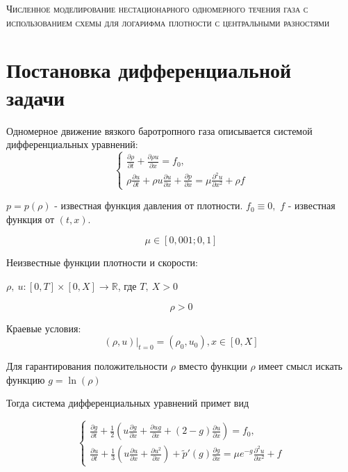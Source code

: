 \documentclass[11pt]{article}
\begin{document}
\begin{center}

\textsc{Численное моделирование нестационарного 
    одномерного течения газа с использованием схемы 
    для логарифма плотности с центральными разностями}

\end{center}

\enlargethispage{9\baselineskip}

\section{Постановка дифференциальной задачи}
Одномерное движение вязкого баротропного газа описывается системой дифференциальных уравнений:
$$
\begin{cases} 
\displaystyle{\frac{\partial \rho}{\partial t} +
 \frac{\partial \rho u}{\partial x} = f_0}, \\

\displaystyle{\rho \frac{\partial u}{\partial t} +
 \rho u \frac{\partial u}{\partial x}+ 
 \frac{\partial p}{\partial x} = 
\mu \frac{\partial^2 u}{\partial x^2}
+ \rho f}
\end{cases}
$$

\begin{center}
$
p = p (\rho)
$ - известная функция давления от плотности. 
$f_0 \equiv 0, $
$f$ - известная функция от $(t, x)$.
\end{center}
$$\mu \in [0,001; 0,1]$$

Неизвестные функции плотности и скорости:

\begin{center}
$\rho,\ u: [0, T] \times [0, X] \rightarrow \mathbb{R}$, где $T,\ X > 0$
\end{center}

$$\rho > 0$$

Краевые условия:
$$(\rho, u)|_{t=0} = (\rho_0, u_0), x \in [0, X]$$

Для гарантирования положительности $\rho$ вместо функции $\rho$ имеет смысл искать функцию $g = \ln(\rho)$ 

Тогда система дифференциальных уравнений примет вид

$$
\begin{cases}
\displaystyle{\frac{\partial g}{\partial t} + \frac{1}{2} \left(u\frac{\partial g}{\partial x} +     \frac{\partial ug}{\partial x} +(2-g)\frac{\partial u}{\partial x}\right) = f_0},\\
\displaystyle{\frac{\partial u}
{\partial t} + \frac{1}{3} \left(u 
\frac{\partial u}{\partial x} +
 \frac{\partial u^2}{\partial x}\right) +
  \tilde{p}'(g)
 \frac{\partial g}{\partial x} = \mu
  e^{-g}\frac{\partial^2 u}{\partial x^2} +
   f}
\end{cases}
$$
\end{document}
